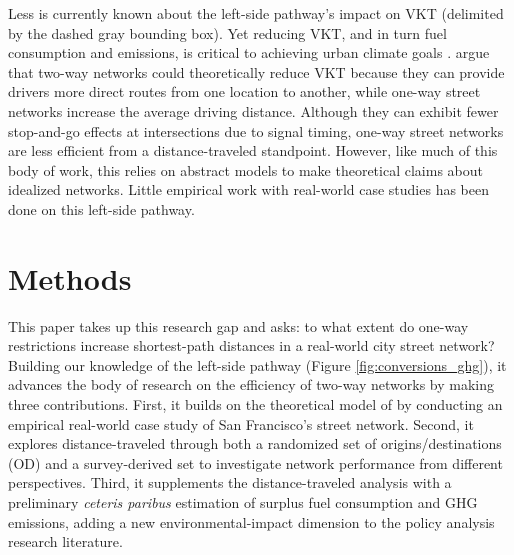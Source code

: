 \documentclass{article}
\begin{document}
Less is currently known about the left-side pathway's impact on VKT (delimited by the dashed gray bounding box). Yet reducing VKT, and in turn fuel consumption and emissions, is critical to achieving urban climate goals \citep{barrington-leigh_more_2017}. \citet{ortigosa_analysis_2019} argue that two-way networks could theoretically reduce VKT because they can provide drivers more direct routes from one location to another, while one-way street networks increase the average driving distance. Although they can exhibit fewer stop-and-go effects at intersections due to signal timing, one-way street networks are less efficient from a distance-traveled standpoint. However, like much of this body of work, this relies on abstract models to make theoretical claims about idealized networks. Little empirical work with real-world case studies has been done on this left-side pathway. 

\section{Methods}

This paper takes up this research gap and asks: to what extent do one-way restrictions increase shortest-path distances in a real-world city street network? Building our knowledge of the left-side pathway (Figure \ref{fig:conversions_ghg}), it advances the body of research on the efficiency of two-way networks by making three contributions. First, it builds on the theoretical model of \citet{ortigosa_analysis_2019} by conducting an empirical real-world case study of San Francisco's street network. Second, it explores distance-traveled through both a randomized set of origins/destinations (OD) and a survey-derived set to investigate network performance from different perspectives. Third, it supplements the distance-traveled analysis with a preliminary \textit{ceteris paribus} estimation of surplus fuel consumption and GHG emissions, adding a new environmental-impact dimension to the policy analysis research literature.
\end{document}
